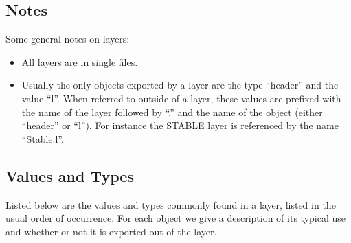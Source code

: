 \subsection{Notes}

Some general notes on layers:
\begin{itemize}
\item
All layers are in single files.
\item
Usually the only objects exported by a layer are the type ``header'' and
the value ``l''.  When referred to outside of a layer, these values are
prefixed with the name of the layer followed by ``.''  and the name of
the object (either ``header'' or ``l'').  For instance the STABLE layer is
referenced by the name ``Stable.l''.
\end{itemize}


\subsection{Values and Types}
Listed below are the values and types commonly found in a layer, listed in
the usual order of occurrence.  For each object we give a description of
its typical use and whether or not it is exported out of the layer.

